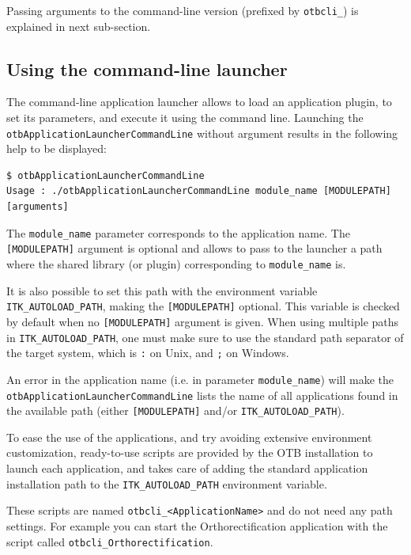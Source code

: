 
Passing arguments to the command-line version (prefixed by
\verb?otbcli_?) is explained in next sub-section.

\subsection{Using the command-line launcher}

The command-line application launcher allows to load an application
plugin, to set its parameters, and execute it using the command
line. Launching the \verb?otbApplicationLauncherCommandLine?
without argument results in the following help to be displayed:

\begin{verbatim}
$ otbApplicationLauncherCommandLine 
Usage : ./otbApplicationLauncherCommandLine module_name [MODULEPATH] [arguments]
\end{verbatim} 

The \verb?module_name? parameter corresponds to the application
name. The \verb?[MODULEPATH]? argument is optional and allows 
to pass to the launcher a path where the shared library (or plugin) 
corresponding to \verb?module_name? is.

It is also possible to set this path with the environment variable 
\verb?ITK_AUTOLOAD_PATH?, making the \verb?[MODULEPATH]? optional.
This variable is checked by default when 
no \verb?[MODULEPATH]? argument is given.
When using multiple paths in \verb?ITK_AUTOLOAD_PATH?, one must make sure to use
the standard path separator of the target system, which is \verb?:? on Unix, and \verb?;? on Windows.


An error in the application name (i.e. in parameter
\verb?module_name?) will make the
\verb?otbApplicationLauncherCommandLine? lists the name of all
applications found in the available path (either \verb?[MODULEPATH]? 
and/or \verb?ITK_AUTOLOAD_PATH?).

To ease the use of the applications, and try avoiding extensive environment
customization, ready-to-use scripts are provided by the OTB installation
to launch each application, and takes care of adding the standard application
installation path to the \verb?ITK_AUTOLOAD_PATH? environment variable.

These scripts are named \verb?otbcli_<ApplicationName>? and do not need any path
settings. For example you can start the Orthorectification application
with the script called \verb?otbcli_Orthorectification?.


